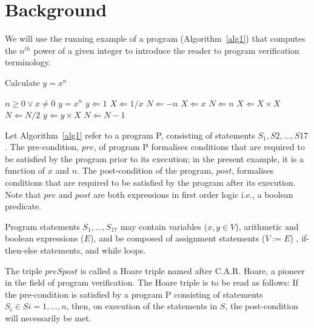 \section{Background} \label{background}

We will use the running example of a program (Algorithm~\ref{alg1}) that computes the $n^{th}$ power of a given integer to introduce the reader to program verification terminology. 

\begin{algorithm}                      %
\caption{Calculate $y = x^n$}          %
\label{alg1}                           %
\begin{algorithmic}[1]                    %
    \REQUIRE $n \geq 0 \vee x \neq 0$
    \ENSURE $y = x^n$
    \STATE $y \Leftarrow 1$
        \STATE $X \Leftarrow 1 / x$
        \STATE $N \Leftarrow -n$
    \ELSE
        \STATE $X \Leftarrow x$
        \STATE $N \Leftarrow n$
    \ENDIF
            \STATE $X \Leftarrow X \times X$
            \STATE $N \Leftarrow N / 2$
        \ELSE[$N$ is odd]
            \STATE $y \Leftarrow y \times X$
            \STATE $N \Leftarrow N - 1$
        \ENDIF
    \ENDWHILE
\end{algorithmic}
\end{algorithm}

Let Algorithm~\ref{alg1} refer to a program P, consisting of statements $S_{1}, S{2}, ..., S{17}$. The pre-condition, $pre$, of program P formalises conditions that are required to be satisfied by the program prior to its execution; in the present example, it is a function of $x$ and $n$. The post-condition of the program, $post$, formalises conditions that are required to be satisfied by the program after its execution. Note that $pre$ and $post$ are both expressions in first order logic i.e., a boolean predicate.

Program statements $S_{1}, ... , S_{17}$ may contain variables ($x, y\in V$), arithmetic and boolean expressions ($E$), and be composed of assignment statements ($V:=E$) , if-then-else statements, and while loops.

The triple $pre${$S$}$post$ is called a Hoare triple named after C.A.R. Hoare, a pioneer in the field of program verification. The Hoare triple is to be read as follows: If the pre-condition is satisfied by a program P consisting of statements $S_{i} \in S i=1,...,n$, then, on execution of the statements in $S$, the post-condition will necessarily be met. 